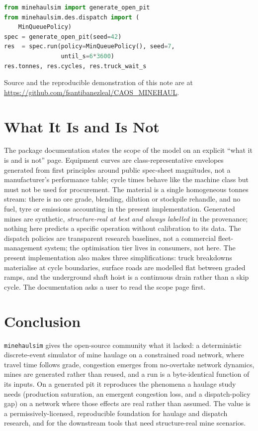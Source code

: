 \documentclass[journal]{IEEEtran}
\begin{document}
\noindent\begin{minipage}{\columnwidth}
\begin{lstlisting}[language=Python]
from minehaulsim import generate_open_pit
from minehaulsim.des.dispatch import (
    MinQueuePolicy)
spec = generate_open_pit(seed=42)
res  = spec.run(policy=MinQueuePolicy(), seed=7,
                until_s=6*3600)
res.tonnes, res.cycles, res.truck_wait_s
\end{lstlisting}
\end{minipage}

Source and the reproducible demonstration of this note are at
\url{https://github.com/fsantibanezleal/CAOS_MINEHAUL}.

\section{What It Is and Is Not}\label{sec:limits}

The package documentation states the scope of the model on an explicit ``what it is and is not'' page. Equipment
curves are class-representative envelopes generated from first principles around public spec-sheet magnitudes, not
a manufacturer's performance table; cycle times behave like the machine class but must not be used for
procurement. The material is a single homogeneous tonnes stream: there is no ore grade, blending, dilution or
stockpile rehandle, and no fuel, tyre or emissions accounting in the present implementation. Generated mines are
synthetic, \emph{structure-real at best and always labelled} in the provenance; nothing here predicts a specific
operation without calibration to its data. The dispatch policies are transparent research baselines, not a
commercial fleet-management system; the optimisation tier lives in consumers, not here. The present implementation
also makes three simplifications: truck breakdowns materialise at cycle boundaries, surface roads are modelled flat
between graded ramps, and the underground shaft hoist is a continuous drain rather than a skip cycle. The
documentation asks a user to read the scope page first.

\section{Conclusion}

\texttt{minehaulsim} gives the open-source community what it lacked: a deterministic discrete-event simulator of
mine haulage on a constrained road network, where travel time follows grade, congestion emerges from
no-overtake network dynamics, mines are generated rather than reused, and a run is a byte-identical function of
its inputs. On a generated pit it reproduces the phenomena a haulage study needs (production saturation, an
emergent congestion loss, and a dispatch-policy gap) on a network where those effects are real rather than
assumed. The value is a permissively-licensed, reproducible foundation for haulage and dispatch research, and for
the downstream tools that need structure-real mine scenarios.
\end{document}
